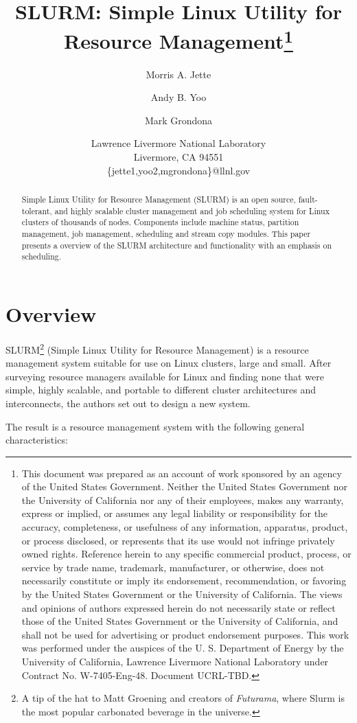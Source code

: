 \documentclass{article}
\title{SLURM: Simple Linux Utility for Resource Management\thanks{
This document was prepared as an account of work sponsored by an
agency of the United States Government.  Neither the United States
Government nor the University of California nor any of their
employees, makes any warranty, express or implied, or assumes any
legal liability or responsibility for the accuracy, completeness, or
usefulness of any information, apparatus, product, or process
disclosed, or represents that its use would not infringe privately
owned rights. Reference herein to any specific commercial product,
process, or service by trade name, trademark, manufacturer, or
otherwise, does not necessarily constitute or imply its endorsement,
recommendation, or favoring by the United States Government or the
University of California.  The views and opinions of authors expressed
herein do not necessarily state or reflect those of the United States
Government or the University of California, and shall not be used for
advertising or product endorsement purposes.
This work was performed under the auspices of the U. S. Department of
Energy by the University of California, Lawrence Livermore National
Laboratory under Contract No. W-7405-Eng-48. Document UCRL-TBD.}}
\author{Morris A. Jette \and Andy B. Yoo \and Mark Grondona}
\date{Lawrence Livermore National Laboratory\\
Livermore, CA 94551\\
\{jette1,yoo2,mgrondona\}@llnl.gov}
\begin{document}
\maketitle

\begin{abstract}
Simple Linux Utility for Resource Management (SLURM) is an open source,
fault-tolerant, and highly scalable cluster management and job 
scheduling system for Linux clusters of thousands of nodes.  Components 
include machine status, partition management, job management, scheduling 
and stream copy modules.  This paper presents a overview of the SLURM architecture and functionality with an emphasis on scheduling.
\end{abstract}

\section{Overview}

SLURM\footnote{A tip of the hat to Matt Groening and creators of {\em Futurama},
where Slurm is the most popular carbonated beverage in the universe.} 
(Simple Linux Utility for Resource Management) is a resource management 
system suitable for use on Linux clusters, large and small.  After 
surveying\cite{Jette2002} resource managers available for Linux and finding 
none that were simple, highly scalable, and portable to different cluster 
architectures and interconnects, the authors set out to design a new system.

The result is a resource management system with the following general
characteristics:
\end{document}
